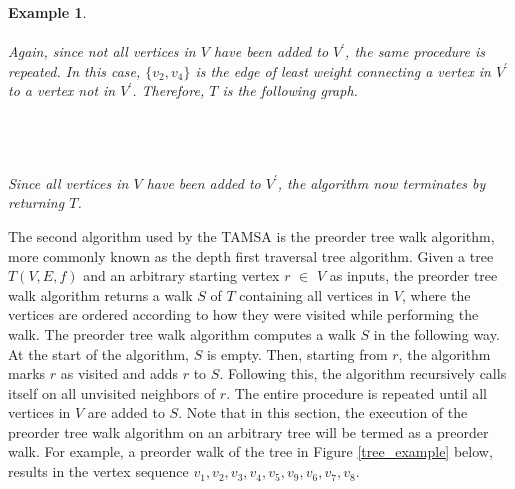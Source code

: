 \documentclass[12pt]{article}
\newtheorem{example}[definition]{Example}
\numberwithin{equation}{subsection}
\numberwithin{table}{subsection}
\begin{document}
\begin{example}
\\\\
Again, since not all vertices in $V$ have been added to $V^\prime$, the same procedure is repeated. In this case, $\{v_2, v_4\}$ is the edge of least weight connecting a vertex in $V^\prime$ to a vertex not in $V^\prime$. Therefore, $T$ is the following graph.\\\\
\\\\
Since all vertices in $V$ have been added to $V^\prime$, the algorithm now terminates by returning $T$.
\end{example}
The second algorithm used by the TAMSA is the preorder tree walk algorithm, more commonly known as the depth first traversal tree algorithm. Given a tree $T(V,E,f)$ and an arbitrary starting vertex $r$ $\in$ $V$ as inputs, the preorder tree walk algorithm returns a walk $S$ of $T$ containing all vertices in $V$, where the vertices are ordered according to how they were visited while performing the walk. The preorder tree walk algorithm computes a walk $S$ in the following way. At the start of the algorithm, $S$ is empty. Then, starting from $r$, the algorithm marks $r$ as visited and adds $r$ to $S$. Following this, the algorithm recursively calls itself on all unvisited neighbors of $r$. The entire procedure is repeated until all vertices in $V$ are added to $S$. Note that in this section, the execution of the preorder tree walk algorithm on an arbitrary tree will be termed as a preorder walk. For example, a preorder walk of the tree in Figure \ref{tree_example} below, results in the vertex sequence $v_1, v_2, v_3, v_4, v_5, v_9, v_6, v_7, v_8$. \cite{cormen_leiserson_rivest_stein}\\\\
\end{document}
